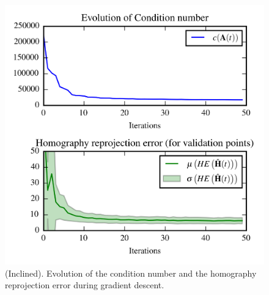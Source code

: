 \documentclass[letterpaper, 10 pt, conference]{ieeeconf}  %
\begin{document}
	\begin{figure}[t]
		\begin{center}
			\includegraphics[width=\columnwidth]{img/homography_inclined.png}
			\caption{\label{fig:IN_cond_homo_error} \small(Inclined). Evolution of the condition number and the homography reprojection error during gradient descent.}
		\end{center}
		\vspace{-0.5cm}
	\end{figure}
	
\end{document}
